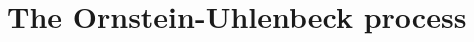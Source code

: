 \documentclass{beamer}
\begin{document}
\begin{frame}{}
%
% 
% 
 \iteme

\end{frame}

\section{The Ornstein-Uhlenbeck process}
\end{document}
